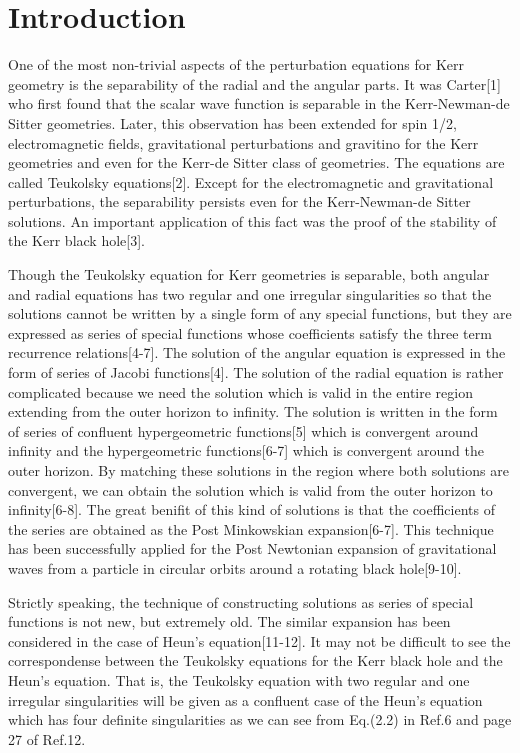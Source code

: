 \renewcommand{\thefootnote}{\arabic{footnote}}
\setcounter{footnote}{0}


\section{Introduction}
One of the most non-trivial aspects of the perturbation 
equations  for Kerr geometry is 
the separability of the radial and the angular parts. 
It was Carter[1] who first found that the scalar 
wave function is separable in the Kerr-Newman-de Sitter geometries. 
Later, this observation has been extended for spin 1/2, 
electromagnetic fields, gravitational perturbations and gravitino 
for the Kerr geometries and even for the Kerr-de Sitter class of 
geometries. The equations are called Teukolsky equations[2]. 
Except for the electromagnetic and gravitational perturbations, 
the separability persists even for the Kerr-Newman-de Sitter solutions. 
An important application of this fact was the proof of the 
stability of the Kerr black hole[3]. 

Though the Teukolsky equation for Kerr geometries is separable, 
both angular and radial equations has two regular and 
one irregular singularities so that the solutions cannot be written by 
a single form of any special functions, 
but they are expressed as series of special 
functions whose coefficients satisfy the three term recurrence 
relations[4-7]. 
The solution of the angular equation is expressed in the form of 
series of Jacobi functions[4]. The solution of the radial equation is rather 
complicated because we need the solution which is valid in the entire 
region extending from the 
outer horizon to infinity. The solution is written in the form of series of 
confluent hypergeometric functions[5] which is convergent around infinity 
and the hypergeometric functions[6-7] which is convergent around the 
outer horizon. By matching these solutions in the region where both solutions 
are convergent, we can obtain the solution which is valid from the 
outer horizon to infinity[6-8]. The great benifit 
of this kind of solutions is that the coefficients of the series are 
obtained as the Post Minkowskian expansion[6-7]. This technique has been 
successfully applied for the Post Newtonian expansion of 
gravitational waves from a particle in circular orbits around a rotating 
black hole[9-10]. 

Strictly speaking, the technique of constructing solutions as 
series of special functions is not new, but extremely old. The similar 
expansion has been considered in the case of Heun's equation[11-12]. 
It may  not be difficult to see the 
correspondense between  the Teukolsky equations for 
the Kerr black hole and the Heun's equation. That is, the Teukolsky 
equation with two regular and  one irregular singularities will  be  
given as a confluent case of the Heun's equation which has 
four definite singularities as we can see from Eq.(2.2) in Ref.6 
and page 27 of Ref.12. 
 
